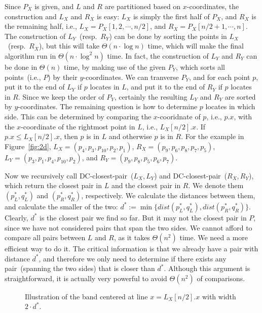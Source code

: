 Since $P_X$ is given, and $L$ and $R$ are partitioned based on $x$-coordinates, 
the construction and $L_X$ and $R_X$ is easy: $L_X$ is simply the first half of $P_X$, 
and $R_X$ is the remaining half, i.e., $L_X = P_X[1, 2, \cdots, n/2]$,
and $R_X = P_X[n/2 +1, \cdots, n]$. The construction of $L_Y$~(resp.\ $R_Y$) can be done
by sorting the points in $L_X$~(resp.\ $R_X$), but this will take $\Theta(n\cdot \log n)$ time,
which will make the final algorithm run in $\Theta(n\cdot \log^ 2n)$ time.
In fact, the construction of $L_Y$ and $R_Y$ can be done in $\Theta(n)$ time,
by making use of the given $P_Y$, which sorts all points~(i.e., $P$) by 
their $y$-coordinates. We can tranverse $P_Y$, and for each point $p$, put it
to the end of $L_Y$ if $p$ locates in $L$, and put it to the end of $R_Y$ if $p$ locates in $R$.
Since we keep the order of $P_Y$, certainly the resulting $L_Y$ and $R_Y$ are sorted by $y$-coordinates.
The remaining question is how to determine $p$ locates in which side.
This can be determined by comparing the $x$-cooridnate of $p$, i.e., $p.x$, with 
the $x$-coordinate of the rightmost point in $L$, i.e., $L_X[n/2].x$.
If $p.x \le L_X[n/2].x$, then $p$ is in $L$ and otherwise $p$ is in $R$.
For the example in Figure~\ref{fig:2d}, 
$L_X = (p_4, p_3, p_{10}, p_2, p_1)$,
$R_X = (p_9, p_6, p_8, p_7, p_5)$,
$L_Y = (p_3, p_1, p_4, p_{10}, p_2)$,
and $R_Y = (p_9, p_8, p_5, p_6, p_7)$.


Now we recursively call DC-closest-pair~($L_X, L_Y$) and DC-closest-pair~($R_X, R_Y$), 
which return the closest pair in $L$ and the closest pair in $R$.
We denote them $(p^*_L, q^*_L)$ and $(p^*_R, q^*_R)$, respectively.
We calculate the distances between them, and calculate the smaller of the two:
$d^* := \min\{dist(p^*_L, q^*_L), dist(p^*_R, q^*_R)\}$.
Clearly, $d^*$ is the closest pair we find so far. But it may not the closest pair in $P$,
since we have not considered pairs that span the two sides.
We cannot afford to compare all pairs between $L$ and $R$, as it takes $\Theta(n^2)$ time.
We need a more efficient way to do it. The critical information is that we already have a pair with distance $d^*$,
and therefore we only need to determine if there exists any pair~(spanning the two sides) that is closer
than $d^*$. Although this argument is straightforward, it is actually very powerful to avoid $\Theta(n^2)$
of comparisons.

\begin{figure}[h!]
\centering{}
\caption{Illustration of the band centered at line $x = L_X[n/2].x$ with width $2\cdot d^*$.}
\label{fig:band}
\end{figure}

